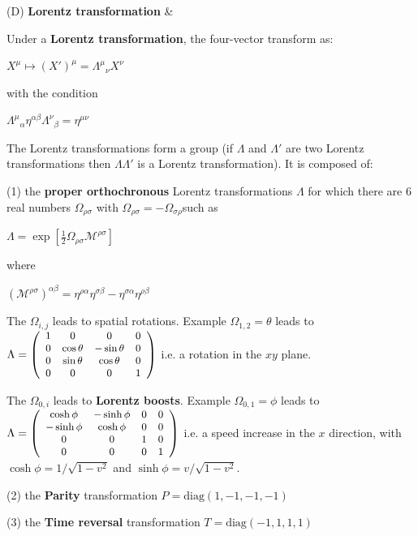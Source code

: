\documentclass[11pt,amsmath,amssymb,latexsym]{article}
\newcommand{\toshDefinition}[2]		{\hline (D) {\bf{#1}} & {#2} \\}
\newcommand{\toshDef}[1]				{{\textbf{#1}}}
\begin{document}
\toshDefinition{Lorentz transformation}{Under a \toshDef{Lorentz transformation}, the four-vector transform as:

\smallskip


\quad $\displaystyle X^\mu \mapsto (X')^\mu = {\Lambda^\mu}_\nu X^\nu$

\smallskip

with the condition
\smallskip

\quad $\displaystyle {\Lambda^\mu}_\alpha \eta^{\alpha\beta}{\Lambda^\nu}_\beta = \eta^{\mu\nu}$

The Lorentz transformations form a group (if $\Lambda$ and $\Lambda'$ are two Lorentz transformations then $\Lambda\Lambda'$ is a Lorentz transformation). It is composed of:

(1) the \toshDef{proper orthochronous} Lorentz transformations $\Lambda$ for which there are 6 real numbers $\Omega_{\rho\sigma}$  with $\Omega_{\rho\sigma} = -\Omega_{\sigma\rho}$such as

\quad $\displaystyle \Lambda = \exp\left[\frac{1}{2} \Omega_{\rho\sigma} \mathcal{M}^{\rho\sigma}\right]$

where 

\quad $\displaystyle\left(\mathcal{M}^{\rho\sigma}\right)^{\alpha\beta} = \eta^{\rho\alpha}\eta^{\sigma\beta} - \eta^{\sigma\alpha}\eta^{\rho\beta}$

\smallskip

The $\Omega_{i,j}$ leads to spatial rotations. Example $\Omega_{1,2} = \theta$ leads to $\small\Lambda = \left(\begin{array}{cccc}1 & 0 & 0 & 0 \\ 0 & \cos\theta & -\sin\theta & 0 \\ 0 & \sin\theta & \cos\theta & 0 \\ 0& 0& 0& 1\end{array}\right)$ i.e. a rotation in the $xy$ plane.

The $\Omega_{0,i}$ leads to \toshDef{Lorentz boosts}. Example $\Omega_{0,1} = \phi$ leads to $\small\Lambda = \left(\begin{array}{cccc}\cosh\phi & -\sinh\phi & 0 & 0 \\ -\sinh\phi & \cosh\phi & 0 & 0 \\ 0 & 0 & 1 & 0 \\ 0& 0& 0& 1\end{array}\right)$ i.e. a speed increase in the $x$ direction, with $\cosh\phi= 1/\sqrt{1-v^2}$ and $\sinh\phi=v/\sqrt{1-v^2}$.

\bigskip

(2) the \toshDef{Parity} transformation $P = \textrm{diag} (1,-1,-1,-1)$

\bigskip

(3) the \toshDef{Time reversal} transformation $T = \textrm{diag} (-1,1,1,1)$
}
\end{document}
